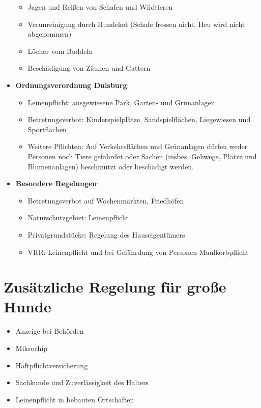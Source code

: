 \begin{itemize}
         \begin{itemize}
             \item Jagen und Reißen von Schafen und Wildtieren
             \item Verunreinigung durch Hundekot (Schafe fressen nicht, Heu wird nicht abgenommen)
             \item Löcher vom Buddeln
             \item Beschädigung von Zäunen und Gattern
         \end{itemize}
         \item \textbf{Ordnungsverordnung Duisburg}:
         \begin{itemize}
             \item Leinenpflicht: ausgewiesene Park, Garten- und Grünanlagen
             \item Betretungsverbot: Kinderspielplätze, Sandspielflächen, Liegewiesen und Sportflächen
             \item Weitere Pflichten: Auf Verkehrsflächen und Grünanlagen dürfen weder Personen noch Tiere gefährdet oder Sachen (insbes. Gehwege, Plätze und Blumenanlagen) beschmutzt oder beschädigt werden.
         \end{itemize}

         \clearpage
         \item \textbf{Besondere Regelungen}:
         \begin{itemize}
             \item Betretungsverbot auf Wochenmärkten, Friedhöfen
             \item Naturschutzgebiet: Leinenpflicht
             \item Privatgrundstücke: Regelung des Hauseigentümers
             \item VRR: Leinenpflicht und bei Gefährdung von Personen Maulkorbpflicht
         \end{itemize}
    \end{itemize}


\section{Zusätzliche Regelung für große Hunde}
    \begin{itemize}
        \item Anzeige bei Behörden
        \item Mikrochip
        \item Haftpflichtversicherung
        \item Sachkunde und Zuverlässigkeit des Halters
        \item Leinenpflicht in bebauten Ortschaften
    \end{itemize}


